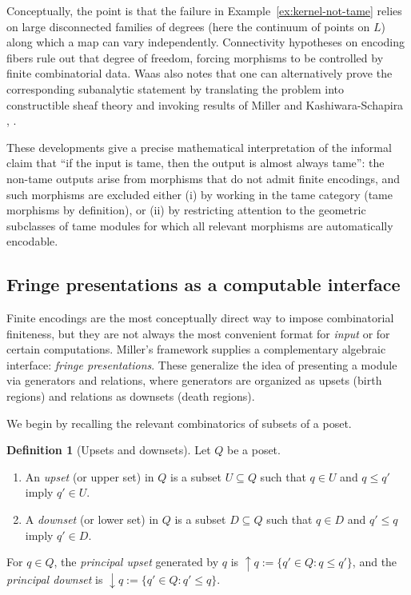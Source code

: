 \documentclass{article}
\newcommand{\<}{\langle}
\renewcommand{\>}{\rangle}
\theoremstyle{definition}
\newtheorem{defn}[theorem]{Definition}
\theoremstyle{remark}
\begin{document}
	Conceptually, the point is that the failure in Example~\ref{ex:kernel-not-tame} relies on
	large disconnected families of degrees (here the continuum of points on $L$) along which a map
	can vary independently.  Connectivity hypotheses on encoding fibers rule out that degree of
	freedom, forcing morphisms to be controlled by finite combinatorial data.  Waas also notes that
	one can alternatively prove the corresponding subanalytic statement by translating the problem
	into constructible sheaf theory and invoking results of Miller and Kashiwara-Schapira
	\cite[Rem.~3.19]{Waa24}, \cite{Mil23,KS18}.

	These developments give a precise mathematical interpretation of the informal claim that
	``if the input is tame, then the output is almost always tame'': the non-tame outputs arise
	from morphisms that do not admit finite encodings, and such morphisms are excluded either
	(i) by working in the tame category (tame morphisms by definition), or
	(ii) by restricting attention to the geometric subclasses of tame modules for which all
	relevant morphisms are automatically encodable.

	\subsection{Fringe presentations as a computable interface}
	\label{subsec:fringe-presentations}
	
	Finite encodings are the most conceptually direct way to impose combinatorial finiteness,
	but they are not always the most convenient format for \emph{input} or for certain
	computations.  Miller's framework supplies a complementary algebraic interface:
	\emph{fringe presentations}.  These generalize the idea of presenting a module via
	generators and relations, where generators are organized as upsets (birth regions) and
	relations as downsets (death regions).
	
	We begin by recalling the relevant combinatorics of subsets of a poset.
	
	\begin{defn}[Upsets and downsets]
		\label{def:upset-downset}
		Let $Q$ be a poset.
		\begin{enumerate}[label=(\roman*)]
			\item An \emph{upset} (or upper set) in $Q$ is a subset $U\subseteq Q$ such that
			$q\in U$ and $q\le q'$ imply $q'\in U$.
			\item A \emph{downset} (or lower set) in $Q$ is a subset $D\subseteq Q$ such that
			$q\in D$ and $q'\le q$ imply $q'\in D$.
		\end{enumerate}
		For $q\in Q$, the \emph{principal upset} generated by $q$ is $\uparrow q := \{q'\in Q : q\le q'\}$,
		and the \emph{principal downset} is $\downarrow q := \{q'\in Q : q'\le q\}$.
	\end{defn}
	
\end{document}
